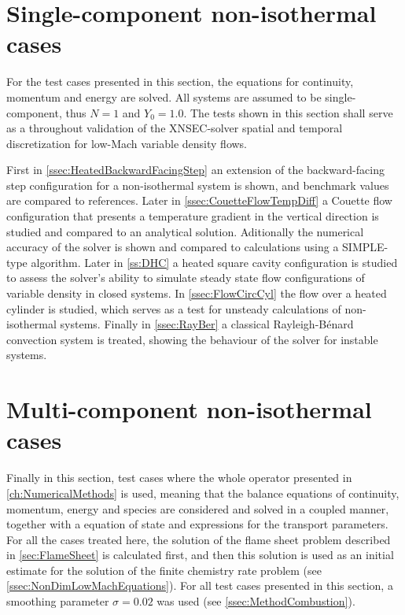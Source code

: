 \section{Single-component non-isothermal cases} \label{sec:SinCompNonIsothermCase}
For the test cases presented in this section, the equations for continuity, momentum and energy are solved. All systems are assumed to be single-component, thus $N = 1$ and $Y_0 = 1.0$. 
The tests shown in this section shall serve as a throughout validation of the XNSEC-solver spatial and temporal discretization for low-Mach variable density flows. 

First in \cref{ssec:HeatedBackwardFacingStep} an extension of the backward-facing step configuration for a non-isothermal system is shown, and benchmark values are compared to references. Later in \cref{ssec:CouetteFlowTempDiff} a Couette flow configuration that presents a temperature gradient in the vertical direction is studied and compared to an analytical solution. Aditionally the numerical accuracy of the solver is shown and compared to calculations using a SIMPLE-type algorithm. Later in \cref{ss:DHC} a heated square cavity configuration is studied to assess the solver's ability to simulate steady state flow configurations of variable density in closed systems. In \cref{ssec:FlowCircCyl} the flow over a heated cylinder is studied, which serves as a test for unsteady calculations of non-isothermal systems. Finally in \cref{ssec:RayBer} a classical Rayleigh-Bénard convection system is treated, showing the behaviour of the solver for instable systems.





\section{Multi-component non-isothermal cases}\label{sec:MultCompNonIsothermCase}
Finally in this section, test cases where the whole operator presented in \cref{ch:NumericalMethods} is used, meaning that the balance equations of continuity, momentum, energy and species are considered and solved in a coupled manner, together with a equation of state and expressions for the transport parameters. For all the cases treated here, the solution of the flame sheet problem described in \cref{sec:FlameSheet} is calculated first, and then this solution is used as an initial estimate for the solution of the finite chemistry rate problem (see \cref{ssec:NonDimLowMachEquations}). For all test cases presented in this section, a smoothing parameter $\sigma = 0.02$ was used (see \cref{ssec:MethodCombustion}). 

